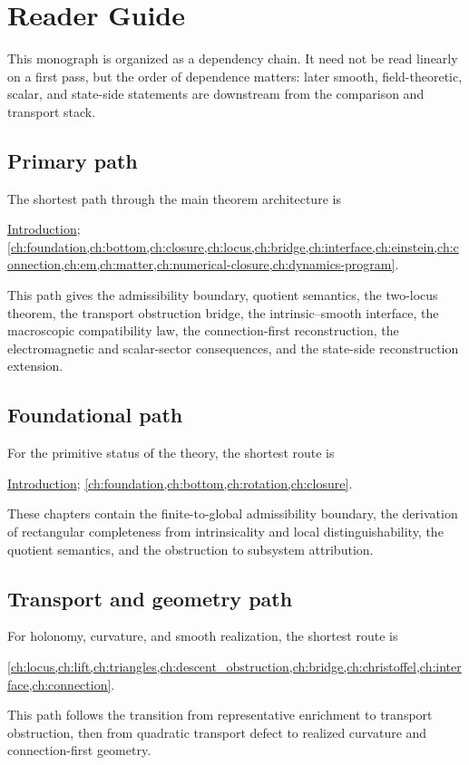 \chapter*{Reader Guide}
{}
\label{ch:reader-guide}
This monograph is organized as a dependency chain.  It need not be
read linearly on a first pass, but the order of
dependence matters: later smooth, field-theoretic, scalar, and
state-side statements are downstream from the comparison and transport
stack.

\section*{Primary path}
The shortest path through the main theorem architecture is
\begin{center}
\hyperref[ch:introduction]{Introduction}; \cref{ch:foundation,ch:bottom,ch:closure,ch:locus,ch:bridge,ch:interface,ch:einstein,ch:connection,ch:em,ch:matter,ch:numerical-closure,ch:dynamics-program}.
\end{center}
This path gives the admissibility boundary, quotient semantics, the
two-locus theorem, the transport obstruction bridge, the
intrinsic--smooth interface, the macroscopic compatibility law, the
connection-first reconstruction, the electromagnetic and scalar-sector
consequences, and the state-side reconstruction extension.

\section*{Foundational path}
For the primitive status of the theory, the shortest route is
\begin{center}
\hyperref[ch:introduction]{Introduction}; \cref{ch:foundation,ch:bottom,ch:rotation,ch:closure}.
\end{center}
These chapters contain the finite-to-global admissibility boundary, the
derivation of rectangular completeness from intrinsicality and local
distinguishability, the quotient semantics, and the obstruction to
subsystem attribution.

\section*{Transport and geometry path}
For holonomy, curvature, and smooth realization, the shortest route is
\begin{center}
\cref{ch:locus,ch:lift,ch:triangles,ch:descent_obstruction,ch:bridge,ch:christoffel,ch:interface,ch:connection}.
\end{center}
This path follows the transition from representative enrichment to
transport obstruction, then from quadratic transport defect to realized
curvature and connection-first geometry.

